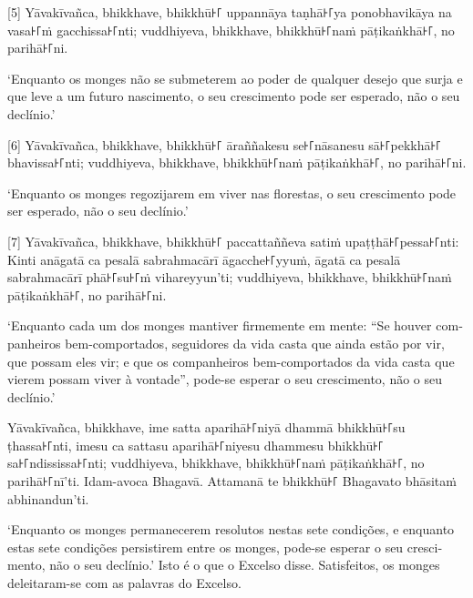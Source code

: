 \enlargethispage{2\baselineskip}

[5] Yāvakīvañca, bhikkhave, bhikkhū꜔꜒ uppannāya taṇhā꜔꜒ya ponobhavikāya na vasa꜔꜒ṁ
gacchissa꜔꜒nti; vuddhiyeva, bhikkhave, bhikkhū꜔꜒naṁ pāṭikaṅkhā꜔꜒, no parihā꜔꜒ni.

\begin{english}
  `Enquanto os monges não se submeterem ao poder de qualquer desejo que surja e
  que leve a um futuro nascimento, o seu crescimento pode ser esperado, não o
  seu declínio.'
\end{english}

[6] Yāvakīvañca, bhikkhave, bhikkhū꜔꜒ āraññakesu se꜔꜒nāsanesu sā꜔꜒pekkhā꜔꜒ bhavissa꜔꜒nti;
vuddhiyeva, bhikkhave, bhikkhū꜔꜒naṁ pāṭikaṅkhā꜔꜒, no parihā꜔꜒ni.

\begin{english}
  `Enquanto os monges regozijarem em viver nas florestas,
  o seu crescimento pode ser esperado, não o seu declínio.'
\end{english}

[7] Yāvakīvañca, bhikkhave, bhikkhū꜔꜒ paccattaññeva satiṁ upaṭṭhā꜔꜒pessa꜔꜒nti: Kinti
anāgatā ca pesalā sabrahmacārī āgacche꜔꜒yyuṁ, āgatā ca pesalā sabrahmacārī phā꜔꜒su꜔꜒ṁ
vihareyyun'ti; vuddhiyeva, bhikkhave, bhikkhū꜔꜒naṁ pāṭikaṅkhā꜔꜒, no parihā꜔꜒ni.

\begin{english}
  `Enquanto cada um dos monges mantiver firmemente em mente: ``Se houver
  companheiros bem-comportados, seguidores da vida casta que ainda estão por
  vir, que possam eles vir; e que os companheiros bem-comportados da vida casta
  que vierem possam viver à vontade'', pode-se esperar o seu crescimento, não o
  seu declínio.'
\end{english}

Yāvakīvañca, bhikkhave, ime satta aparihā꜔꜒niyā dhammā bhikkhū꜔꜒su ṭhassa꜔꜒nti, imesu
ca sattasu aparihā꜔꜒niyesu dhammesu bhikkhū꜔꜒ sa꜔꜒ndississa꜔꜒nti; vuddhiyeva, bhikkhave,
bhikkhū꜔꜒naṁ pāṭikaṅkhā꜔꜒, no parihā꜔꜒nī'ti. Idam-avoca Bhagavā. Attamanā te bhikkhū꜔꜒
Bhagavato bhāsitaṁ abhinandun'ti.

\begin{english}
  `Enquanto os monges permanecerem resolutos nestas sete condições, e enquanto
  estas sete condições persistirem entre os monges, pode-se esperar o seu
  crescimento, não o seu declínio.' Isto é o que o Excelso disse. Satisfeitos,
  os monges deleitaram-se com as palavras do Excelso.
\end{english}
